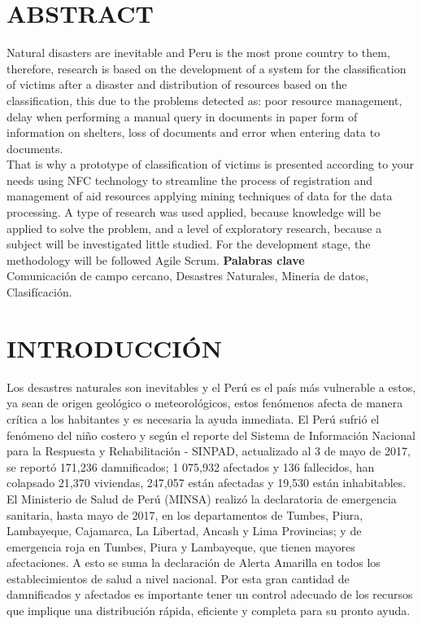 \documentclass[11pt,openany]{book}
\begin{document}
	\chapter*{ABSTRACT}
	
	Natural disasters are inevitable and Peru is the most prone country
	to them, therefore, research is based on the development of a system for
	the classification of victims after a disaster and distribution of
	resources based on the classification, this due to the problems detected
	as: poor resource management, delay when performing a manual query
	in documents in paper form of information on shelters, loss of
	documents and error when entering data to documents.\\
	That is why a prototype of classification of victims is presented
	according to your needs using NFC technology to streamline the process
	of registration and management of aid resources applying mining techniques of data for the data processing. A type of research was used
	applied, because knowledge will be applied to solve the problem, and
	a level of exploratory research, because a subject will be investigated
	little studied. For the development stage, the methodology will be followed Agile Scrum.
	\newpage
	\textbf{Palabras clave}\\[0.25cm]
	Comunicación de campo cercano, Desastres Naturales, Mineria de datos, Clasifícación.

	\newpage
	\chapter*{INTRODUCCIÓN}
	
	Los desastres naturales son inevitables y el Perú es el país más vulnerable a estos, ya sean de origen geológico o meteorológicos, estos fenómenos afecta de manera crítica a los habitantes y es necesaria la ayuda inmediata. El Perú sufrió el fenómeno del niño costero y según el reporte del Sistema de Información Nacional para la Respuesta y Rehabilitación - SINPAD, actualizado al 3 de mayo de 2017, se reportó 171,236 damnificados; 1 075,932 afectados y 136 fallecidos, han colapsado 21,370 viviendas, 247,057 están afectadas y 19,530 están inhabitables. El Ministerio de Salud de Perú (MINSA) realizó la declaratoria de emergencia sanitaria, hasta mayo de 2017, en los departamentos de Tumbes, Piura, Lambayeque, Cajamarca, La Libertad, Ancash y Lima Provincias; y de emergencia roja en Tumbes, Piura y Lambayeque, que tienen mayores afectaciones. A esto se suma la declaración de Alerta Amarilla en todos los establecimientos de salud a nivel nacional. Por esta gran cantidad de damnificados y afectados es importante tener un control adecuado de los recursos que implique una distribución rápida, eficiente y completa para su pronto ayuda. \\
\end{document}
